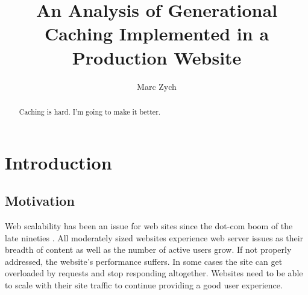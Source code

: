 \documentclass[12pt]{ucthesis}
\begin{document}

\title{An Analysis of Generational Caching Implemented in a Production Website}
\author{Marc Zych}
  
 
     



\maketitle

\begin{frontmatter}

\copyrightpage

\committeemembershippage

\begin{abstract}

Caching is hard. I'm going to make it better.

\end{abstract}


\tableofcontents


\listoftables

\listoffigures

\end{frontmatter}

\pagestyle{plain}




\renewcommand{\baselinestretch}{1.66}


\chapter{Introduction}
\label{introduction}

\section{Motivation}
Web scalability has been an issue for web sites since the dot-com boom of the late nineties \cite{webServerScaling}.
All moderately sized websites experience web server issues as their breadth of content as well as the number of active users grow.
If not properly addressed, the website's performance suffers.
In some cases the site can get overloaded by requests and stop responding altogether.
Websites need to be able to scale with their site traffic to continue providing a good user experience.
\end{document}
